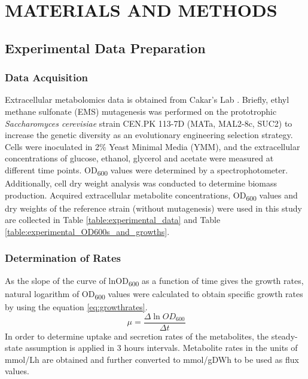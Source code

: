 \chapter{MATERIALS AND METHODS}

\section{Experimental Data Preparation}
\subsection{Data Acquisition}
Extracellular metabolomics data is obtained from Cakar's Lab \cite{arslan2018physiological}. Briefly, ethyl methane sulfonate (EMS) mutagenesis was performed on the prototrophic \emph{Saccharomyces cerevisiae} strain CEN.PK 113-7D (MATa, MAL2-8c, SUC2) to increase the genetic diversity as an evolutionary engineering selection strategy. Cells were inoculated in 2\% Yeast Minimal Media (YMM), and the extracellular concentrations of glucose, ethanol, glycerol and acetate were measured at different time points. OD\textsubscript{600} values were determined by a spectrophotometer. Additionally, cell dry weight analysis was conducted to determine biomass production. Acquired extracellular metabolite concentrations, OD\textsubscript{600} values and dry weights of the reference strain (without mutagenesis) were used in this study are collected in Table \ref{table:experimental_data} and Table \ref{table:experimental_OD600s_and_growths}.


\subsection{Determination of Rates}
As the slope of the curve of lnOD\textsubscript{600} as a function of time gives the growth rates, natural logarithm of OD\textsubscript{600} values were calculated to obtain specific growth rates by using the equation \ref{eq:growthrates}.
  \begin{equation}
      \ \mu = \frac{\Delta \ln{OD_{600}}}{\Delta t}
      \label{eq:growthrates}
  \end{equation}
In order to determine uptake and secretion rates of the metabolites, the steady-state assumption is applied in 3 hours intervals. Metabolite rates in the units of mmol/Lh are obtained and further converted to mmol/gDWh to be used as flux values.




